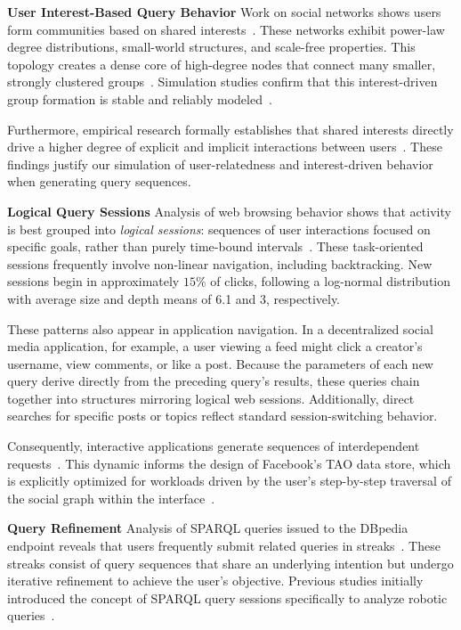 \textbf{User Interest-Based Query Behavior}
Work on social networks shows users form communities based on shared interests~\cite{mislove2007measurement,clark2007understanding,backstrom2006group,kalaitzakis2012evolution}. 
These networks exhibit power-law degree distributions, small-world structures, and scale-free properties. 
This topology creates a dense core of high-degree nodes that connect many smaller, strongly clustered groups~\cite{mislove2007measurement}. 
Simulation studies confirm that this interest-driven group formation is stable and reliably modeled~\cite{amblard2015models,hamill2009social}.

Furthermore, empirical research formally establishes that shared interests directly drive a higher degree of explicit and implicit interactions between users~\cite{mitzlaff2013user}. 
These findings justify our simulation of user-relatedness and interest-driven behavior when generating query sequences.

\textbf{Logical Query Sessions}
Analysis of web browsing behavior shows that activity is best grouped into \emph{logical sessions}: sequences of user interactions focused on specific goals, 
rather than purely time-bound intervals~\cite{meiss_whats_2009,sadagopan2008characterizing,schneider2009understanding}. 
These task-oriented sessions frequently involve non-linear navigation, 
including backtracking. 
New sessions begin in approximately $15\%$ of clicks, 
following a log-normal distribution with average size and depth means of 6.1 and 3, respectively. 

These patterns also appear in application navigation. 
In a decentralized social media application, for example, 
a user viewing a feed might click a creator's username, view comments, or like a post. 
Because the parameters of each new query derive directly from the preceding query's results, 
these queries chain together into structures mirroring logical web sessions. 
Additionally, direct searches for specific posts or topics reflect standard session-switching behavior. 

Consequently, interactive applications generate sequences of interdependent requests~\cite{vogele2018wessbas}. 
This dynamic informs the design of Facebook's TAO data store, 
which is explicitly optimized for workloads driven by the user's step-by-step traversal of the social graph within the interface~\cite{bronson2013tao}.

\textbf{Query Refinement}  
Analysis of SPARQL queries issued to the DBpedia endpoint reveals that 
users frequently submit related queries in streaks~\cite{bonifati2020analytical,zhang2020characterizing}. 
These streaks consist of query sequences that share an underlying intention but undergo 
iterative refinement to achieve the user's objective. 
Previous studies initially introduced the concept of SPARQL query sessions specifically to analyze 
robotic queries~\cite{zhang2020characterizing,bonifati2020analytical}.

